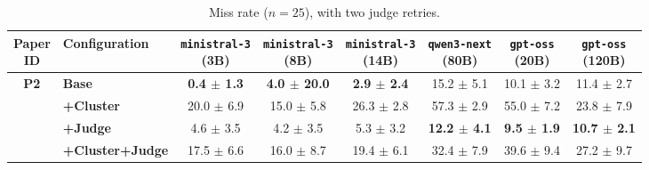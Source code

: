\begin{table}[htbp]
    \centering
    \small
    \setlength{\tabcolsep}{4pt}
    \caption{Miss rate ($n=25$), with two judge retries.}
    \begin{tabular}{c|l|cccccc}
        \toprule
        \makecell{\textbf{Paper} \\ \textbf{ID}} & \textbf{Configuration}& \makecell{\texttt{ministral-3} \\ (3B)} & \makecell{\texttt{ministral-3} \\ (8B)} & \makecell{\texttt{ministral-3} \\ (14B)} & \makecell{\texttt{qwen3-next} \\ (80B)} & \makecell{\texttt{gpt-oss} \\ (20B)} & \makecell{\texttt{gpt-oss} \\ (120B)} \\
        \hline
        
        \multirow{4}{*}{\textbf{P2}} 
          & \textbf{Base}& \textbf{0.4 $\pm$ 1.3} & \textbf{4.0 $\pm$ 20.0} & \textbf{2.9 $\pm$ 2.4} & 15.2 $\pm$ 5.1 & 10.1 $\pm$ 3.2 & 11.4 $\pm$ 2.7 \\
          & \textbf{+Cluster}& 20.0 $\pm$ 6.9 & 15.0 $\pm$ 5.8 & 26.3 $\pm$ 2.8 & 57.3 $\pm$ 2.9 & 55.0 $\pm$ 7.2 & 23.8 $\pm$ 7.9 \\
          & \textbf{+Judge}& 4.6 $\pm$ 3.5 & 4.2 $\pm$ 3.5 & 5.3 $\pm$ 3.2 & \textbf{12.2 $\pm$ 4.1} & \textbf{9.5 $\pm$ 1.9} & \textbf{10.7 $\pm$ 2.1} \\
          & \textbf{+Cluster+Judge}& 17.5 $\pm$ 6.6 & 16.0 $\pm$ 8.7 & 19.4 $\pm$ 6.1 & 32.4 $\pm$ 7.9 & 39.6 $\pm$ 9.4 & 27.2 $\pm$ 9.7 \\
        \hline
        
        \bottomrule
    \end{tabular}
    \label{tab:miss_rate_p2}
\end{table}